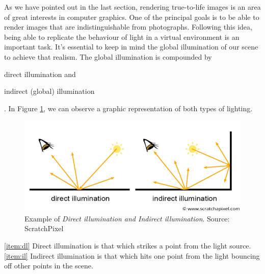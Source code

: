 \documentclass[titlepage,12pt]{article}
\begin{document}
As we have pointed out in the last section, rendering true-to-life images is an area of great interests in computer graphics. One of the principal goals is to be able to render images that are indistinguishable from photographs. Following this idea, being able to replicate the behaviour of light in a virtual environment is an important task. It's essential to keep in mind the global illumination of our scene to achieve that realism. The global illumination is compounded by \begin{enumerate*}[label=\roman*)] \item direct illumination \label{item:dl} and \item indirect (global) illumination \label{item:il} \end{enumerate*}. In Figure \ref{globalil}, we can observe a graphic representation of both types of lighting.

\begin{figure}[!ht]
	\centering
	\includegraphics[scale=0.45]{media/shad2-globalillum3.png}
	\caption{Example of \textit{Direct illumination and Indirect illumination}. Source: ScratchPixel}
	\label{globalil}
\end{figure}

\ref{item:dl} Direct illumination is that which strikes a point from the light source.\\
\ref{item:il} Indirect illumination is that which hits one point from the light bouncing off other points in the scene.
\end{document}
